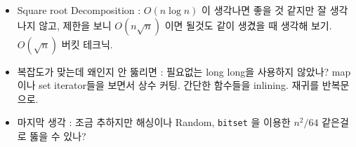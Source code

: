 \documentclass[landscape,8pt]{article}
\begin{document}
\begin{multicols}{2}
\begin{itemize}
      \item Square root Decomposition : $O(n \log n)$ 이 생각나면 좋을 것 같지만 잘 생각나지 않고, 제한을 보니 $O(n \sqrt{n})$ 이면 될것도 같이 생겼을 때 생각해 보기. $O(\sqrt{n})$ 버킷 테크닉.
      \item 복잡도가 맞는데 왜인지 안 뚫리면 : 필요없는 long long을 사용하지 않았나? map이나 set iterator들을 보면서 상수 커팅. 간단한 함수들을 inlining. 재귀를 반복문으로.
      \item 마지막 생각 : 조금 추하지만 해싱이나 Random, \texttt{bitset} 을 이용한 $n^2 / 64$ 같은걸로 뚫을 수 있나?
    \end{itemize}
\newpage

\end{multicols}
\end{document}
